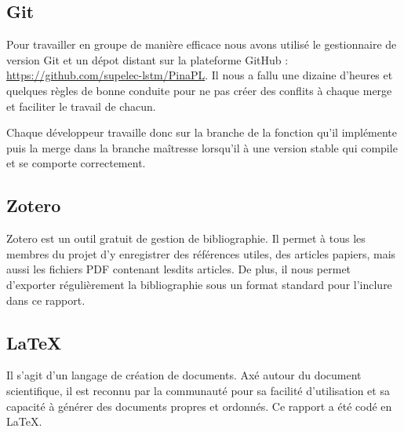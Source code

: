 \subsection{Git}

Pour travailler en groupe de manière efficace nous avons utilisé le
gestionnaire de version Git et un dépot distant sur la plateforme GitHub :
\url{https://github.com/supelec-lstm/PinaPL}. Il nous a fallu une dizaine
d'heures et quelques règles de bonne conduite pour ne pas créer des conflits à
chaque merge et faciliter le travail de chacun.

\smallskip

Chaque développeur travaille donc sur la branche de la fonction qu'il
implémente puis la merge dans la branche maîtresse lorsqu'il à une version
stable qui compile et se comporte correctement.

\subsection{Zotero}

Zotero est un outil gratuit de gestion de bibliographie. Il permet à tous les
membres du projet d'y enregistrer des références utiles, des articles papiers,
mais aussi les fichiers PDF contenant lesdits articles.
De plus, il nous permet d'exporter régulièrement la bibliographie sous un
format standard pour l'inclure dans ce rapport.

\subsection{LaTeX}

Il s'agit d'un langage de création de documents. Axé autour du document
scientifique, il est reconnu par la communauté pour sa facilité d'utilisation
et sa capacité à générer des documents propres et ordonnés. Ce rapport a été
codé en LaTeX.
